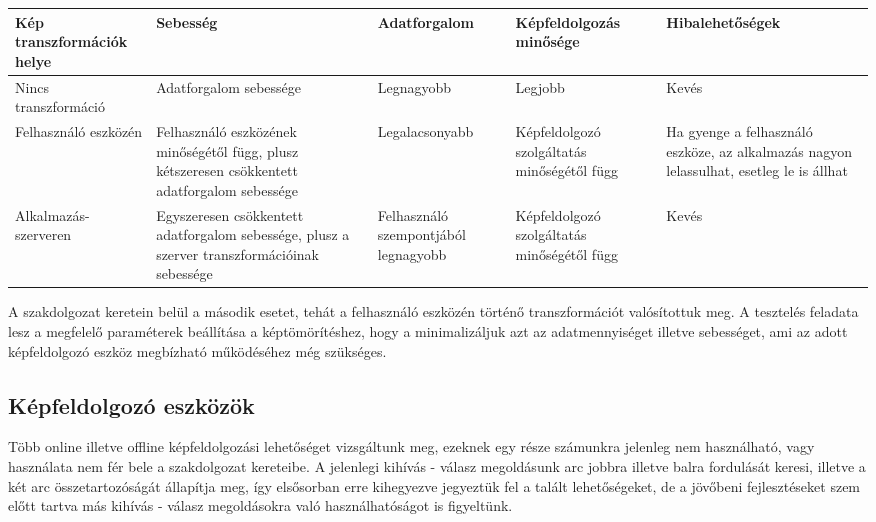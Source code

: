 \begin{center}
	\begin{tabular}{|p{2cm}|p{3cm} |p{3cm} | p{3cm}|p{3cm}|}
   	\hline
	\textbf{Kép transzformációk helye} & \textbf{Sebesség} & \textbf{Adatforgalom} & \textbf{Képfeldolgozás minősége} &\textbf{ Hibalehetőségek} \\ \hline
	Nincs transzformáció & Adatforgalom sebessége & Legnagyobb & Legjobb & Kevés \\ \hline
	Felhasználó eszközén & Felhasználó eszközének minőségétől függ, plusz kétszeresen csökkentett adatforgalom sebessége & Legalacsonyabb & Képfeldolgozó szolgáltatás minőségétől függ & Ha gyenge a felhasználó eszköze, az alkalmazás nagyon lelassulhat, esetleg le is állhat \\ \hline
	Alkalmazás-szerveren & Egyszeresen csökkentett adatforgalom sebessége, plusz a szerver transzformációinak sebessége & Felhasználó szempontjából legnagyobb & Képfeldolgozó szolgáltatás minőségétől függ & Kevés\\ \hline
	\end{tabular}
\end{center}

A szakdolgozat keretein belül a második esetet, tehát a felhasználó eszközén történő transzformációt valósítottuk meg. A tesztelés feladata lesz a megfelelő paraméterek beállítása a képtömörítéshez, hogy a minimalizáljuk azt az adatmennyiséget illetve sebességet, ami az adott képfeldolgozó eszköz megbízható működéséhez még szükséges.

\subsection{Képfeldolgozó eszközök}
Több online illetve offline képfeldolgozási lehetőséget vizsgáltunk meg, ezeknek egy része számunkra jelenleg nem használható, vagy használata nem fér bele a szakdolgozat kereteibe. A jelenlegi kihívás - válasz megoldásunk arc jobbra illetve balra fordulását keresi, illetve a két arc összetartozóságát állapítja meg, így elsősorban erre kihegyezve jegyeztük fel a talált lehetőségeket, de a jövőbeni fejlesztéseket szem előtt tartva más kihívás - válasz megoldásokra való használhatóságot is figyeltünk.
